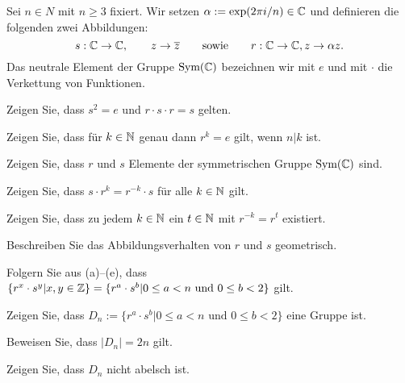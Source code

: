 \begin{Problem}
		Sei $n\in N$ mit $n\ge 3$ fixiert. Wir setzen $\alpha := \exp ( 2\pi i / n ) \in \mathbb{C}$ und definieren die folgenden zwei Abbildungen:
	\[
		s:\mathbb{C}\to \mathbb{C}, \qquad z\to \overline{z}\qquad\text{sowie}\qquad r:\mathbb{C}\to\mathbb{C}, z\to\alpha z
	.\] 
	Das neutrale Element der Gruppe $\text{Sym}(\mathbb{C})$ bezeichnen wir mit $e$ und mit $\cdot$ die Verkettung von Funktionen.
	\begin{parts}
	\item Zeigen Sie, dass $s^2=e$ und $r\cdot s\cdot r=s$ gelten.
	\item Zeigen Sie, dass für $k\in\mathbb{N}$ genau dann $r^k = e$ gilt, wenn $n|k$ ist.
	\item Zeigen Sie, dass $r$ und $s$ Elemente der symmetrischen Gruppe $\text{Sym}(\mathbb{C})$ sind.
	\item Zeigen Sie, dass $s\cdot r^k = r^{-k} \cdot s$ für alle $k \in\mathbb{N}$ gilt.
	\item Zeigen Sie, dass zu jedem $k\in \mathbb{N}$ ein $t\in \mathbb{N}$ mit $r^{-k}=r^t$ existiert.
	\item Beschreiben Sie das Abbildungsverhalten von $r$ und $s$ geometrisch.
	\item Folgern Sie aus (a)–(e), dass $\{r^x \cdot s^y | x, y \in \mathbb{Z}\} = \{r^a \cdot s^b | 0 \le a < n\text{ und }0 \le b < 2\}$ gilt.
	\item Zeigen Sie, dass $D_n := \{r^a \cdot s^b |0 \le a < n\text{ und }0 \le b < 2\}$ eine Gruppe ist.
	\item Beweisen Sie, dass $|D_n| = 2n$ gilt.
	\item Zeigen Sie, dass $D_n$ nicht abelsch ist.
	\end{parts}
\end{Problem}
